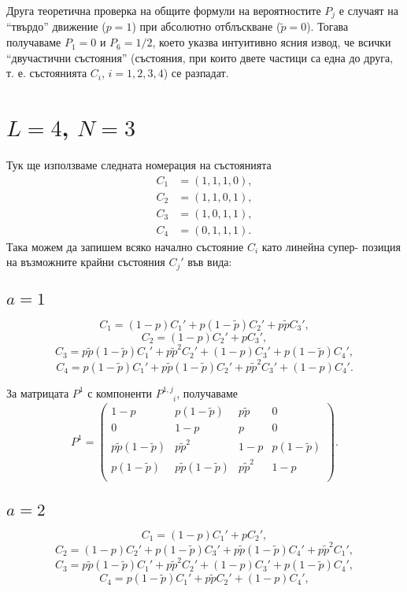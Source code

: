 \documentclass[english,bulgarian,a4paper,10pt]{article}
\begin{document}
Друга теоретична проверка на общите формули на вероятностите $P_j$
е случаят на ``твърдо'' движение ($p=1$) при абсолютно отблъскване
($\tilde{p}=0$). Тогава получаваме $P_1=0$ и $P_6=1/2$, което
указва интуитивно ясния извод, че всички ``двучастични състояния''
(състояния, при които двете частици са една до друга, т. е. състоянията
$C_{i}$, $i=1,2,3,4$) се разпадат.








\section{$L=4$, $N=3$}
Тук ще използваме следната номерация на състоянията
\begin{equation}
\begin{split}
C_1 &= (1,1,1,0),\\
C_2 &= (1,1,0,1),\\
C_3 &= (1,0,1,1),\\
C_4 &= (0,1,1,1).
\end{split}
\end{equation}
Така можем да запишем всяко начално състояние $C_{i}$ като линейна супер- позиция
на възможните крайни състояния $C_{j}'$ във вида:

\subsection{$a=1$}
$$C_1 = (1-p) C_1' + p(1-\tilde{p}) C_2' + p\tilde{p} C_3',$$
$$C_2 = (1-p) C_2' + p C_3',$$
$$C_3 = p\tilde{p}(1-\tilde{p}) C_1' + p\tilde{p}^2 C_2' + (1-p) C_3' + p(1-\tilde{p}) C_4',$$
$$C_4 = p(1-\tilde{p}) C_1' + p\tilde{p}(1-\tilde{p}) C_2' + p\tilde{p}^2 C_3' + (1-p) C_4'.$$

За матрицата $P^{1}$ с компоненти $P^{1,j}_{\phantom{1,j}i}$, получаваме
\begin{equation}
 P^{1} = \begin{pmatrix}
          1-p &p(1-\tilde{p}) &p\tilde{p} &0\\
          0 &1-p &p &0\\
          p\tilde{p}(1-\tilde{p}) &p\tilde{p}^2 &1-p &p(1-\tilde{p})\\
          p(1-\tilde{p}) &p\tilde{p}(1-\tilde{p}) &p\tilde{p}^2 &1-p\\
         \end{pmatrix}.
\end{equation}
\subsection{$a=2$}
$$C_1 = (1-p) C_1' + p C_2',$$
$$C_2 = (1-p) C_2' + p(1-\tilde{p}) C_3' + p\tilde{p}(1-\tilde{p}) C_4' + p\tilde{p}^2 C_1',$$
$$C_3 = p\tilde{p}(1-\tilde{p}) C_1' + p\tilde{p}^{2} C_2' + (1-p) C_3' + p(1-\tilde{p}) C_4',$$
$$C_4 = p(1-\tilde{p}) C_1' + p\tilde{p} C_2' + (1-p) C_4',$$
\end{document}
